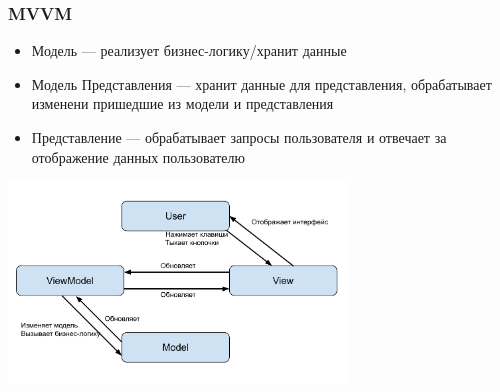 \documentclass[aspectratio=169]{beamer}
\begin{document}
\begin{frame}[fragile]
  \transwipe[direction=90]
  \frametitle{MVVM}
  \begin{minipage}{.4\textwidth}
    \begin{itemize}
      \item Модель --- реализует бизнес-логику/хранит данные
      \item Модель Представления --- хранит данные для представления, обрабатывает изменени пришедшие из модели и представления
      \item Представление --- обрабатывает запросы пользователя и отвечает за отображение данных пользователю
    \end{itemize}
  \end{minipage}
  \begin{minipage}{.56\textwidth}
    \includegraphics[width=9cm]{pictures/MVVM.pdf}
  \end{minipage}

\end{frame}
\end{document}
